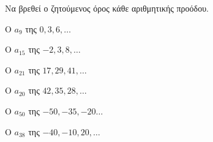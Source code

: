 Να βρεθεί ο ζητούμενος όρος κάθε αριθμητικής προόδου.
\begin{multicols}{2}
\begin{alist}
\item Ο $ a_9 $ της $ 0,3,6,\ldots $
\item Ο $ a_{15} $ της $ -2,3,8,\ldots $
\item Ο $ a_{21} $ της $ 17,29,41,\ldots $
\item Ο $ a_{20} $ της $ 42,35,28,\ldots $
\item Ο $ a_{50} $ της $ -50,-35,-20\ldots $
\item Ο $ a_{38} $ της $ -40,-10,20,\ldots $
\end{alist}
\end{multicols}
